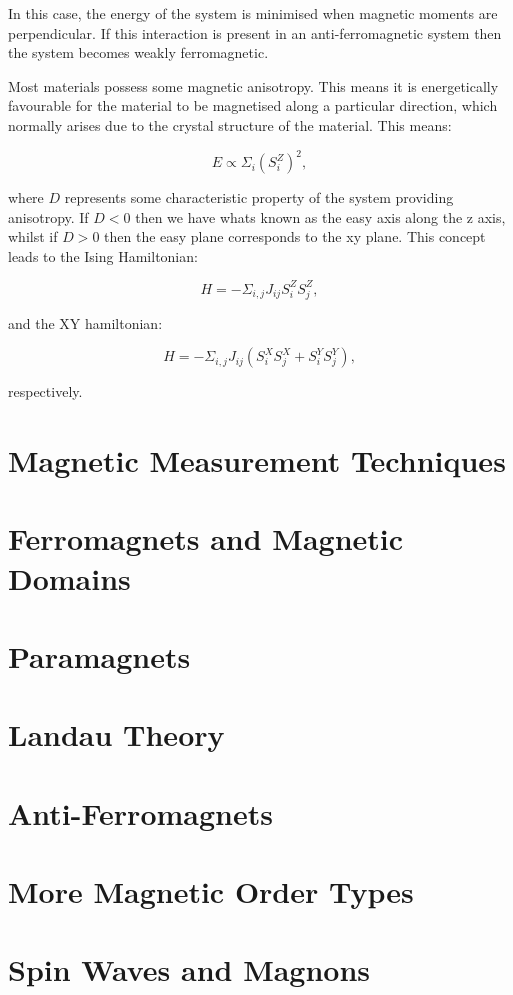\noindent In this case, the energy of the system is minimised when magnetic moments are perpendicular. If this interaction is present in an anti-ferromagnetic system then the system becomes weakly ferromagnetic.

\noindent Most materials possess some magnetic anisotropy. This means it is energetically favourable for the material to be magnetised along a particular direction, which normally arises due to the crystal structure of the material. This means:

\begin{equation}
    E \propto \Sigma_i (S^Z_i)^2,
    \label{MagneticAnisotropyEnergy}
\end{equation}

\noindent where $D$ represents some characteristic property of the system providing anisotropy. If $D < 0$ then we have whats known as the easy axis along the z axis, whilst if $D > 0$ then the easy plane corresponds to the xy plane. This concept leads to the Ising Hamiltonian:

\begin{equation}
    H = -\Sigma_{i,j} J_{ij} S^Z_i S^Z_j,
    \label{IsingHamiltonian}
\end{equation}

\noindent and the XY hamiltonian:

\begin{equation}
    H = -\Sigma_{i,j} J_{ij} (S^X_i S^X_j + S^Y_i S^Y_j),
    \label{HamiltonianXY}
\end{equation}

\noindent respectively.

\section{Magnetic Measurement Techniques}

\section{Ferromagnets and Magnetic Domains}

\section{Paramagnets}

\section{Landau Theory}

\section{Anti-Ferromagnets}

\section{More Magnetic Order Types}

\section{Spin Waves and Magnons}